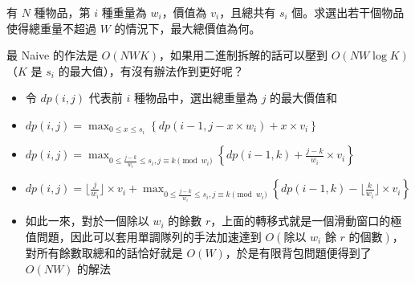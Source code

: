 \documentclass[standalone]{beamer}
\begin{document}
\begin{frame}{}
  \begin{problem}[有限個數的多重背包問題]
    有 $N$ 種物品，第 $i$ 種重量為 $w_i$，價值為 $v_i$，且總共有 $s_i$ 個。求選出若干個物品使得總重量不超過 $W$ 的情況下，最大總價值為何。
  \end{problem}

  最 Naive 的作法是 $O(NWK)$，如果用二進制拆解的話可以壓到 $O(NW \log K)$（$K$ 是 $s_i$ 的最大值），有沒有辦法作到更好呢？
\end{frame}


\begin{frame}{}
  \begin{itemize}
    \item 令 $dp(i, j)$ 代表前 $i$ 種物品中，選出總重量為 $j$ 的最大價值和
    \item $dp(i, j) = \max_{0 \leq x \leq s_i}\left\{dp(i - 1, j - x \times w_i) + x \times v_i \right\}$
    \item $dp(i, j) = \max_{0 \leq \frac{j - k}{w_i} \leq s_i, j \equiv k \pmod w_i}\left\{dp(i - 1, k) + \frac{j - k}{w_i} \times v_i \right\}$
    \item $dp(i, j) = \lfloor\frac{j}{w_i}\rfloor \times v_i + \max_{0 \leq \frac{j - k}{w_i} \leq s_i, j \equiv k \pmod w_i}\left\{dp(i - 1, k) - \lfloor\frac{k}{w_i}\rfloor \times v_i \right\}$
    \item 如此一來，對於一個除以 $w_i$ 的餘數 $r$，上面的轉移式就是一個滑動窗口的極值問題，因此可以套用單調隊列的手法加速達到 $O(\text{除以 $w_i$ 餘 $r$ 的個數})$，對所有餘數取總和的話恰好就是 $O(W)$，於是有限背包問題便得到了 $O(NW)$ 的解法
  \end{itemize}
\end{frame}
\end{document}
